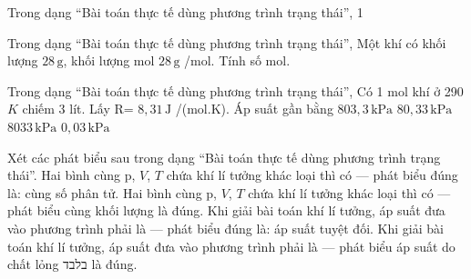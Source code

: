 \begin{bt}
Trong dạng “Bài toán thực tế dùng phương trình trạng thái”, 1
\end{bt}

\begin{ex}
Trong dạng “Bài toán thực tế dùng phương trình trạng thái”, Một khí có khối lượng $28\,\text{g}$, khối lượng mol $28\,\text{g}$ /mol. Tính số mol.
\end{ex}

\begin{ex}
Trong dạng “Bài toán thực tế dùng phương trình trạng thái”, Có 1 mol khí ở 290 $K$ chiếm 3 lít. Lấy R= $8,31\,\text{J}$ /(mol.K). Áp suất gần bằng
\choice
{\True $803,3\,\text{kPa}$}
{$80,33\,\text{kPa}$}
{$8033\,\text{kPa}$}
{$0,03\,\text{kPa}$}
\end{ex}

\begin{ex}
Xét các phát biểu sau trong dạng “Bài toán thực tế dùng phương trình trạng thái”.
\choiceTF
{\True Hai bình cùng p, $V$, $T$ chứa khí lí tưởng khác loại thì có — phát biểu đúng là: cùng số phân tử.}
{Hai bình cùng p, $V$, $T$ chứa khí lí tưởng khác loại thì có — phát biểu cùng khối lượng là đúng.}
{\True Khi giải bài toán khí lí tưởng, áp suất đưa vào phương trình phải là — phát biểu đúng là: áp suất tuyệt đối.}
{Khi giải bài toán khí lí tưởng, áp suất đưa vào phương trình phải là — phát biểu áp suất do chất lỏng בלבד là đúng.}
\end{ex}

